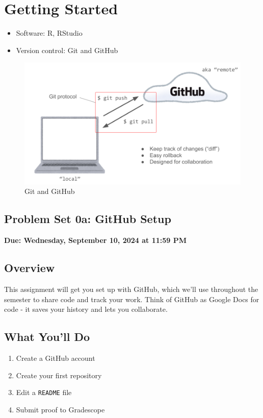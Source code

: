 \documentclass[
  11pt,
  letterpaper]{article}
\providecommand{\tightlist}{%
  \setlength{\itemsep}{0pt}\setlength{\parskip}{0pt}}
\begin{document}
\section{Getting Started}\label{getting-started}

\begin{itemize}
\item
  Software: R, RStudio
\item
  Version control: Git and GitHub
\end{itemize}

\begin{figure}
\centering
\includegraphics[width=0.75\linewidth,height=\textheight,keepaspectratio]{assets/gitvsgithub.png}
\caption{Git and GitHub}
\end{figure}

\newpage

\begin{center}
  \section{Problem Set 0a: GitHub Setup}
  \textbf{Due: Wednesday, September 10, 2024 at 11:59 PM}
\end{center}

\subsection{Overview}\label{overview}

This assignment will get you set up with GitHub, which we'll use
throughout the semester to share code and track your work. Think of
GitHub as Google Docs for code - it saves your history and lets you
collaborate.

\subsection{What You'll Do}\label{what-youll-do}

\begin{enumerate}
\def\labelenumi{\arabic{enumi}.}
\tightlist
\item
  Create a GitHub account
\item
  Create your first repository
\item
  Edit a \texttt{README} file
\item
  Submit proof to Gradescope
\end{enumerate}
\end{document}

